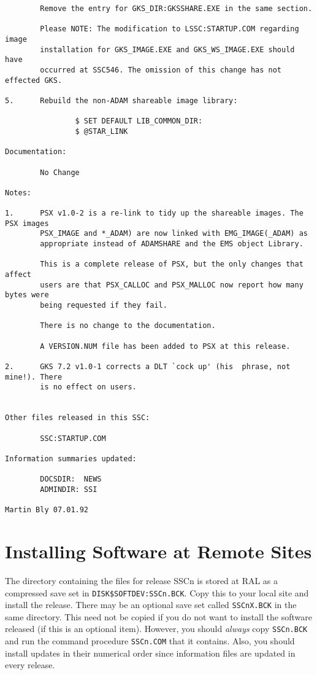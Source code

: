 \begin{verbatim}
        Remove the entry for GKS_DIR:GKSSHARE.EXE in the same section.

        Please NOTE: The modification to LSSC:STARTUP.COM regarding image
        installation for GKS_IMAGE.EXE and GKS_WS_IMAGE.EXE should have
        occurred at SSC546. The omission of this change has not effected GKS.

5.      Rebuild the non-ADAM shareable image library:

                $ SET DEFAULT LIB_COMMON_DIR:
                $ @STAR_LINK

Documentation:

        No Change

Notes:

1.      PSX v1.0-2 is a re-link to tidy up the shareable images. The PSX images
        PSX_IMAGE and *_ADAM) are now linked with EMG_IMAGE(_ADAM) as
        appropriate instead of ADAMSHARE and the EMS object Library.

        This is a complete release of PSX, but the only changes that affect
        users are that PSX_CALLOC and PSX_MALLOC now report how many bytes were
        being requested if they fail.

        There is no change to the documentation.

        A VERSION.NUM file has been added to PSX at this release.

2.      GKS 7.2 v1.0-1 corrects a DLT `cock up' (his  phrase, not mine!). There
        is no effect on users.


Other files released in this SSC:

        SSC:STARTUP.COM

Information summaries updated:

        DOCSDIR:  NEWS
        ADMINDIR: SSI

Martin Bly 07.01.92
\end{verbatim}

\newpage

\section {Installing Software at Remote Sites}

The directory containing the files for release SSCn is stored at RAL as a
compressed save set in {\tt DISK\$SOFTDEV:\-SSCn.\-BCK}.
Copy this to your local site and install the release.
There may be an optional save set called {\tt SSCnX.BCK} in the same directory.
This need not be copied if you do not want to install the software released
(if this is an optional item).
However, you should {\em always} copy {\tt SSCn.BCK} and run the command
procedure {\tt SSCn.COM} that it contains.
Also, you should install updates in their numerical order since information
files are updated in every release.

